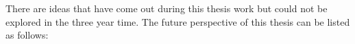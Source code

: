 There are ideas that have come out during this thesis work but could not be explored in the three year time.
The future perspective of this thesis can be listed as follows:
